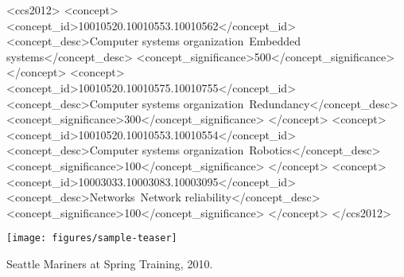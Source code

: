 \documentclass[sigconf, anonymous, review]{acmart}  %
\newcommand\todo[1]{\textcolor{red}{TODO #1}}
\begin{document}
%
\begin{abstract}
A clear and well-documented \LaTeX\ document is presented as an article formatted for publication by ACM in
a conference proceedings or journal publication. Based on the ``acmart'' document class, this article presents
and explains many of the common variations, as well as many of the formatting elements
an author may use in the preparation of the documentation of their work. \todo{use this command to highlight remaining work.}
\end{abstract}

%
%
\begin{CCSXML}
<ccs2012>
 <concept>
  <concept_id>10010520.10010553.10010562</concept_id>
  <concept_desc>Computer systems organization~Embedded systems</concept_desc>
  <concept_significance>500</concept_significance>
 </concept>
 <concept>
  <concept_id>10010520.10010575.10010755</concept_id>
  <concept_desc>Computer systems organization~Redundancy</concept_desc>
  <concept_significance>300</concept_significance>
 </concept>
 <concept>
  <concept_id>10010520.10010553.10010554</concept_id>
  <concept_desc>Computer systems organization~Robotics</concept_desc>
  <concept_significance>100</concept_significance>
 </concept>
 <concept>
  <concept_id>10003033.10003083.10003095</concept_id>
  <concept_desc>Networks~Network reliability</concept_desc>
  <concept_significance>100</concept_significance>
 </concept>
</ccs2012>
\end{CCSXML}


%

%
\begin{teaserfigure}
  \texttt{[image: figures/sample-teaser]}
  \caption{Seattle Mariners at Spring Training, 2010.}
  \label{fig:teaser}
\end{teaserfigure}
\end{document}
